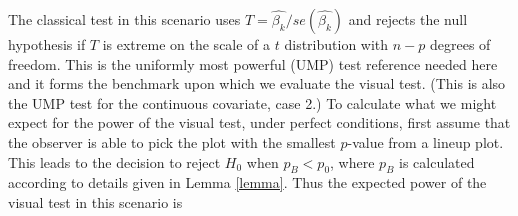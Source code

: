 \documentclass{article}
\newcommand{\red}[1]{{\color{red} #1}}
\newcommand{\green}[1]{{\color{green} #1}} %
\begin{document}


The classical test in this scenario uses $T= \hat{\beta_k}/ se(\hat{\beta_k})$ and rejects the null hypothesis if $T$ is extreme on the scale of a $t$ distribution with $n-p$ degrees of freedom. This is the uniformly most powerful (UMP) test \green{reference needed here} and it forms the benchmark upon which we evaluate the visual test. (This is also the UMP test for the continuous covariate, case 2.) To calculate what we might expect for the power of the visual test, under perfect conditions, first assume that the observer is able to pick the plot with the smallest $p$-value from a lineup plot.  This leads to the decision to reject $H_0$ when $p_{B} < p_0$, where $p_{B}$ is calculated according to details given in Lemma \ref{lemma}. Thus the expected power of the visual test in this scenario is
\end{document}
